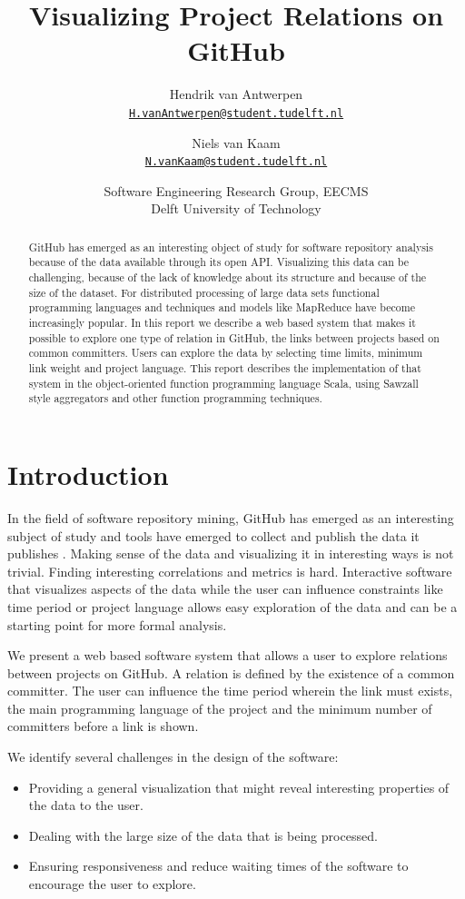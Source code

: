 \documentclass[10pt,a4paper]{article}
\title{Visualizing Project Relations on GitHub}
\author{
    Hendrik van Antwerpen\\{\small\href{mailto:H.vanAntwerpen@student.tudelft.nl}{\nolinkurl{H.vanAntwerpen@student.tudelft.nl}}}
  \and
    Niels van Kaam\\{\small\href{mailto:N.vanKaam@student.tudelft.nl}{\nolinkurl{N.vanKaam@student.tudelft.nl}}}
}
\date{Software Engineering Research Group, EECMS\\Delft University of Technology}
\begin{document}
\maketitle

\begin{abstract}
GitHub has emerged as an interesting object of study for software repository analysis because of the data available through its open API. Visualizing this data can be challenging, because of the lack of knowledge about its structure and because of the size of the dataset. For distributed processing of large data sets functional programming languages and techniques and models like MapReduce have become increasingly popular. In this report we describe a web based system that makes it possible to explore one type of relation in GitHub, the links between projects based on common committers. Users can explore the data by selecting time limits, minimum link weight and project language. This report describes the implementation of that system in the object-oriented function programming language Scala, using Sawzall style aggregators and other function programming techniques.
\end{abstract}

\section{Introduction}

In the field of software repository mining, GitHub has emerged as an interesting subject of study and tools have emerged to collect and publish the data it publishes \citep{gousios2012ghtorrent}. Making sense of the data and visualizing it in interesting ways is not trivial. Finding interesting correlations and metrics is hard. Interactive software that visualizes aspects of the data while the user can influence constraints like time period or project language allows easy exploration of the data and can be a starting point for more formal analysis.

We present a web based software system that allows a user to explore relations between projects on GitHub. A relation is defined by the existence of a common committer. The user can influence the time period wherein the link must exists, the main programming language of the project and the minimum number of committers before a link is shown.

We identify several challenges in the design of the software:
\begin{itemize}
    \item Providing a general visualization that might reveal interesting properties of the data to the user.
    \item Dealing with the large size of the data that is being processed.
    \item Ensuring responsiveness and reduce waiting times of the software to encourage the user to explore.
\end{itemize}
\end{document}
